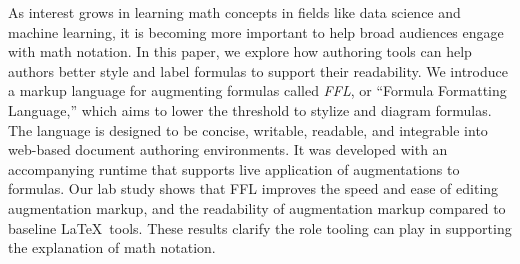 As interest grows in learning math concepts in fields like data science and machine learning, it is becoming more important to help broad audiences engage with math notation. In this paper, we explore how authoring tools can help authors better style and label formulas to support their readability.
We introduce a markup language for augmenting formulas called \emph{FFL}, or ``Formula Formatting Language,'' which aims to lower the threshold to stylize and diagram formulas. The language is designed to be concise, writable, readable, and integrable into web-based document authoring environments. It was developed with an accompanying runtime that supports live application of augmentations to formulas. Our lab study shows that FFL improves the speed and ease of editing augmentation markup, and the readability of augmentation markup compared to baseline \LaTeX\ tools. These results clarify the role tooling can play in supporting the explanation of math notation.